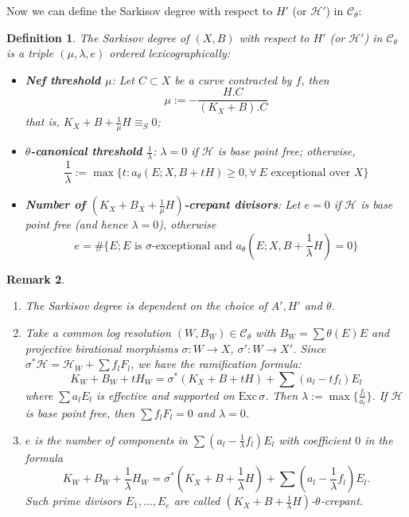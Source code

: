 \documentclass[11pt]{amsart}
\newtheorem{defn}{Definition}[section]
\newtheorem{rmk}[defn]{Remark}
\begin{document}
Now we can define the Sarkisov degree  with respect to $H'$ (or $\mathcal{H}'$) in $\mathcal{C}_{\theta}$:
\begin{defn}\label{sarkisovdegree}
  \cite[Definition 3.8]{brunoLogSarkisovProgram1995}
  The Sarkisov degree of $ (X,B) $ with respect to $ H' $ (or $ \mathcal{H}' $) in $ \mathcal{C}_\theta $ is a triple $ (\mu,\lambda,e) $ ordered lexicographically:
  \begin{itemize}
    \item \textbf{Nef threshold $ \mu $}: Let $ C\subset X  $ be a curve contracted by $ f $, then
          \[ \mu:=-\frac{H.C}{(K_X+B).C} \]
          that is, $ K_X+B+\frac{1}{\mu} H \equiv_S0$;
    \item \textbf{$ \theta $-canonical threshold  $ \frac{1}{\lambda} $}: $\lambda=0$ if $ \mathcal{H} $ is base point free; otherwise,
          \[ \frac{1}{\lambda}:=\max\{t:a_{\theta}(E;X,B+tH)\geqslant 0,  \forall \ E\text{ exceptional over }X \}\]
    \item \textbf{Number of $(K_{X}+B_{X}+\frac{1}{\mu}H)$-crepant divisors}: Let $ e=0 $ if $ \mathcal{H} $ is base point free (and hence $ \lambda=0 $), otherwise
          \[ e=\#\{E; E \text{ is }\sigma\text{-exceptional and } a_{\theta}(E;X,B+\frac{1}{\lambda} H)=0 \} \]
  \end{itemize}
\end{defn}
\begin{rmk}
  \begin{enumerate}
    \item  The Sarkisov degree is dependent on the choice of  $A', H'$ and  $\theta$.
    \item Take a common log resolution  $ (W,B_W)\in \mathcal{C}_\theta $ with $ B_W=\sum \theta(E)E $ and projective birational morphisms $ \sigma:W\to X $, $ \sigma':W\to X' $. Since $\sigma^*\mathcal{H}=\mathcal{H}_W+\sum f_{l}F_{l}$, we have the ramification formula:
          \[ K_W+B_W+tH_W=\sigma^*(K_X+B+tH)+\sum(a_l-tf_l)E_l \]
          where $ \sum a_lE_l $ is effective and supported on $ \mathrm{Exc}\,\sigma $. Then $\lambda:=\max\{ \frac{f_l}{a_l}\}$. If $ \mathcal{H} $ is base point free, then $ \sum f_lF_l=0 $ and $\lambda=0  $.
    \item   $ e $ is the number of components in $\sum(a_l-\frac{1}{\lambda}f_l)E_l$ with coefficient $ 0 $ in the formula
          \[ K_W+B_W+\frac{1}{\lambda} H_W=\sigma^*(K_X+B+\frac{1}{\lambda} H)+\sum(a_l-\frac{1}{\lambda} f_l)E_l .\]
          Such prime divisors $E_{1},\ldots, E_{e}$ are called $(K_{X}+B+\frac{1}{\lambda}H)$-$\theta$-crepant.
  \end{enumerate}
\end{rmk}
\end{document}
